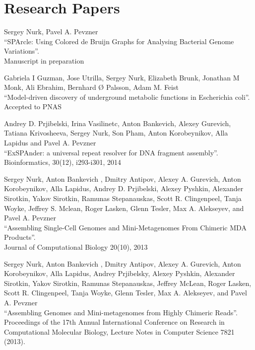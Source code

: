\section{Research Papers}
%
\begin{innerlist}
\item 
Sergey Nurk, Pavel A. Pevzner\\
``SPArcle: Using Colored de Bruijn Graphs for Analysing Bacterial Genome Variations''. \\
Manuscript in preparation

\blankline

\item 
Gabriela I Guzman, Jose Utrilla, Sergey Nurk, Elizabeth Brunk, Jonathan M Monk, Ali Ebrahim, Bernhard Ø Palsson, Adam M. Feist\\
``Model-driven discovery of underground metabolic functions in Escherichia coli''. \\
Accepted to PNAS

\blankline

\item Andrey D. Prjibelski, Irina Vasilinetc, Anton Bankevich, Alexey Gurevich, Tatiana Krivosheeva, Sergey Nurk, Son Pham, Anton Korobeynikov, Alla Lapidus and Pavel A. Pevzner\\
``ExSPAnder: a universal repeat resolver for DNA fragment assembly''. \\
Bioinformatics, 30(12), i293-i301, 2014

\blankline

\item Sergey Nurk, Anton Bankevich %
, Dmitry Antipov, Alexey A. Gurevich, Anton Korobeynikov, Alla Lapidus, Andrey D. Prjibelski, Alexey Pyshkin, Alexander Sirotkin, Yakov Sirotkin, Ramunas Stepanauskas, Scott R. Clingenpeel, Tanja Woyke, Jeffrey S. Mclean, Roger Lasken, Glenn Tesler, Max A. Alekseyev, and Pavel A. Pevzner \\
``Assembling Single-Cell Genomes and Mini-Metagenomes From Chimeric MDA Products''. \\
Journal of Computational Biology 20(10), 2013

\blankline

\item Sergey Nurk, Anton Bankevich %
, Dmitry Antipov, Alexey A. Gurevich, Anton Korobeynikov, Alla Lapidus, Andrey Prjibelsky, Alexey Pyshkin, Alexander Sirotkin, Yakov Sirotkin, Ramunas Stepanauskas, Jeffrey McLean, Roger Lasken, Scott R. Clingenpeel, Tanja Woyke, Glenn Tesler, Max A. Alekseyev, and Pavel A. Pevzner \\
``Assembling Genomes and Mini-metagenomes from Highly Chimeric Reads''. \\
Proceedings of the 17th Annual International Conference on Research in Computational Molecular Biology, Lecture Notes in Computer Science 7821 (2013).


\end{innerlist}
